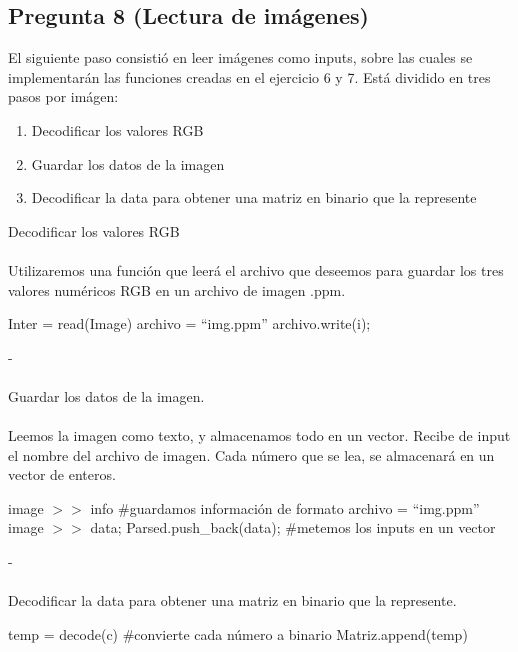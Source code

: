 \documentclass{article}
\newcommand{\TITLE}[1]{\item[#1]}
\begin{document}
		\subsection*{Pregunta 8 (Lectura de imágenes)}
		El siguiente paso consistió en leer imágenes como inputs, sobre las cuales se implementarán las funciones creadas en el ejercicio 6 y 7. Está dividido en tres pasos por imágen:
		\begin{enumerate}
			\item Decodificar los valores RGB
			\item Guardar los datos de la imagen
			\item Decodificar la data para obtener una matriz en binario que la represente
		\end{enumerate}
		Decodificar los valores RGB\\\\
		Utilizaremos una función que leerá el archivo que deseemos para guardar los tres valores numéricos RGB en un archivo de imagen .ppm.\\
		\begin{algorithmic}[1]
			\TITLE{\textsc{interpreter}$(image)$}
			\STATE Inter = read(Image)
			\STATE archivo = “img.ppm”
			\STATE archivo.write(i);
			\ENDFOR
		\end{algorithmic}
	-\\\\
		Guardar los datos de la imagen.\\\\
		Leemos la imagen como texto, y almacenamos todo en un vector. Recibe de input el nombre del archivo de imagen. Cada número que se lea, se almacenará en un vector de enteros.
		\begin{algorithmic}[1]
			\TITLE{\textsc{readImage}$(image)$}
			\STATE image $>>$ info  \#guardamos información de formato
			\STATE archivo = “img.ppm”
			\STATE image $>>$ data;
			\STATE Parsed.push\_back(data);  \#metemos los inputs en un vector
			\ENDWHILE
		\end{algorithmic}
		-\\\\
		Decodificar la data para obtener una matriz en binario que la represente.
		\begin{algorithmic}[1]
			\TITLE{\textsc{decodeMain}$(parsed, A)$}
			\STATE temp = decode(c) \#convierte cada número a binario
			\STATE Matriz.append(temp)
			\ENDFOR
		\end{algorithmic}
		
\end{document}
